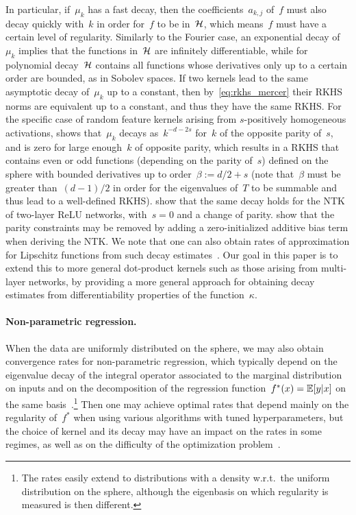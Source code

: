 In particular, if~$\mu_k$ has a fast decay, then the coefficients~$a_{k,j}$ of~$f$ must also decay quickly with~$k$ in order for~$f$ to be in~${\mathcal H}$, which means~$f$ must have a certain level of regularity.
Similarly to the Fourier case, an exponential decay of~$\mu_k$ implies that the functions in~${\mathcal H}$ are infinitely differentiable,
while for polynomial decay~${\mathcal H}$ contains all functions whose derivatives only up to a certain order are bounded, as in Sobolev spaces.
If two kernels lead to the same asymptotic decay of~$\mu_k$ up to a constant, then by~\eqref{eq:rkhs_mercer} their RKHS norms are equivalent up to a constant, and thus they have the same RKHS.
For the specific case of random feature kernels arising from $s$-positively homogeneous activations, \citet{bach2017breaking} shows that~$\mu_k$ decays as~$k^{-d-2 s}$ for~$k$ of the opposite parity of~$s$, and is zero for large enough~$k$ of opposite parity, which results in a RKHS that contains even or odd functions (depending on the parity of~$s$) defined on the sphere with bounded derivatives up to order~$\beta := d/2 + s$ (note that~$\beta$ must be greater than~$(d-1)/2$ in order for the eigenvalues of~$T$ to be summable and thus lead to a well-defined RKHS).
\citet{bietti2019inductive} show that the same decay holds for the NTK of two-layer ReLU networks, with~$s = 0$ and a change of parity.
\citet{basri2019convergence} show that the parity constraints may be removed by adding a zero-initialized additive bias term when deriving the NTK.
We note that one can also obtain rates of approximation for Lipschitz functions from such decay estimates~\citep{bach2017breaking}.
Our goal in this paper is to extend this to more general dot-product kernels such as those arising from multi-layer networks, by providing a more general approach for obtaining decay estimates from differentiability properties of the function~$\kappa$.

\paragraph{Non-parametric regression.}
When the data are uniformly distributed on the sphere, we may also obtain convergence rates for non-parametric regression, which typically depend on the eigenvalue decay of the integral operator associated to the marginal distribution on inputs and on the decomposition of the regression function~$f^*(x) = \operatorname{\mathbb{E}}[y | x]$ on the same basis~\citep[\eg,][]{caponnetto2007optimal}.\footnote{The rates easily extend to distributions with a density w.r.t.~the uniform distribution on the sphere, although the eigenbasis on which regularity is measured is then different.}
Then one may achieve optimal rates that depend mainly on the regularity of~$f^*$ when using various algorithms with tuned hyperparameters, but the choice of kernel and its decay may have an impact on the rates in some regimes, as well as on the difficulty of the optimization problem~\citep[see, \eg,][Section 4.3]{bach2013sharp}.

